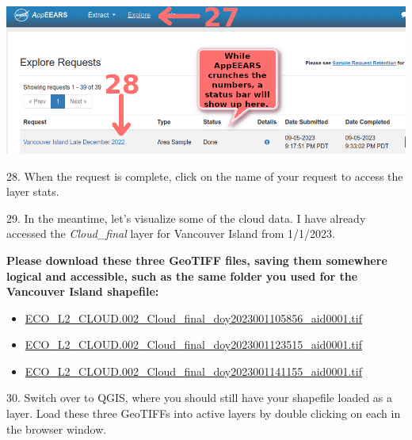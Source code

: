 \documentclass[oneside,a4paper,11pt,explicit]{book}
\begin{document}
	\centerline{\includegraphics[width=.75\textwidth]{ExploreRequest.png}}
	
	28. When the request is complete, click on the name of your request to access the layer stats.
	
	29. In the meantime, let's visualize some of the cloud data. I have already accessed the \textit{Cloud\_final} layer for Vancouver Island from 1/1/2023. 
	
	\begin{tcolorbox}[colback=yellow!5!white,title=\textbf{Vancouver Island \textit{Cloud\_final} Layer Files}]
			
		\textbf{Please download these three GeoTIFF files, saving them somewhere logical and accessible, such as the same folder you used for the Vancouver Island shapefile:}
			
		\vspace{-1em}
			
		\begin{itemize}
			\item \href{https://jeremydforsythe.github.io/icecream-tutorials/Tutorial4_TemperatureCompetition/ECO_L2_CLOUD.002_Cloud_final_doy2023001105856_aid0001.tif}{ECO\_L2\_CLOUD.002\_Cloud\_final\_doy2023001105856\_aid0001.tif}
			\item \href{https://jeremydforsythe.github.io/icecream-tutorials/Tutorial4_TemperatureCompetition/ECO_L2_CLOUD.002_Cloud_final_doy2023001123515_aid0001.tif}{ECO\_L2\_CLOUD.002\_Cloud\_final\_doy2023001123515\_aid0001.tif}
			\item \href{https://jeremydforsythe.github.io/icecream-tutorials/Tutorial4_TemperatureCompetition/ECO_L2_CLOUD.002_Cloud_final_doy2023001141155_aid0001.tif}{ECO\_L2\_CLOUD.002\_Cloud\_final\_doy2023001141155\_aid0001.tif}
		\end{itemize}
			
	\end{tcolorbox}
	
	30. Switch over to QGIS, where you should still have your shapefile loaded as a layer. Load these three GeoTIFFs into active layers by double clicking on each in the browser window.
	
\end{document}
